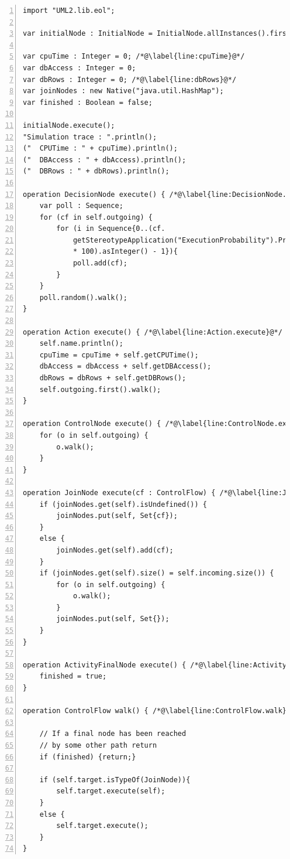 \begin{lstlisting}[float=tbp, basicstyle=\ttfamily\footnotesize, flexiblecolumns=true, numbers=left, nolol=true, caption=Simulation using EOL, label=lst:SAP.EOL, language=EOL, tabsize=2]
import "UML2.lib.eol";

var initialNode : InitialNode = InitialNode.allInstances().first();

var cpuTime : Integer = 0; /*@\label{line:cpuTime}@*/
var dbAccess : Integer = 0;
var dbRows : Integer = 0; /*@\label{line:dbRows}@*/
var joinNodes : new Native("java.util.HashMap");
var finished : Boolean = false;

initialNode.execute();
"Simulation trace : ".println();
("	CPUTime : " + cpuTime).println();
("	DBAccess : " + dbAccess).println();
("	DBRows : " + dbRows).println();

operation DecisionNode execute() { /*@\label{line:DecisionNode.execute}@*/
	var poll : Sequence;
	for (cf in self.outgoing) {
		for (i in Sequence{0..(cf.
			getStereotypeApplication("ExecutionProbability").Probability 
			* 100).asInteger() - 1}){
			poll.add(cf);
		}
	}
	poll.random().walk();
}

operation Action execute() { /*@\label{line:Action.execute}@*/
	self.name.println();
	cpuTime = cpuTime + self.getCPUTime();
	dbAccess = dbAccess + self.getDBAccess();
	dbRows = dbRows + self.getDBRows();
	self.outgoing.first().walk();
}

operation ControlNode execute() { /*@\label{line:ControlNode.execute}@*/
	for (o in self.outgoing) {
		o.walk();
	}
}

operation JoinNode execute(cf : ControlFlow) { /*@\label{line:JoinNode.execute}@*/
	if (joinNodes.get(self).isUndefined()) {
		joinNodes.put(self, Set{cf});
	}
	else {
		joinNodes.get(self).add(cf);
	}
	if (joinNodes.get(self).size() = self.incoming.size()) {
		for (o in self.outgoing) {
			o.walk();
		}
		joinNodes.put(self, Set{});
	}
}

operation ActivityFinalNode execute() { /*@\label{line:ActivityFinalNode.execute}@*/
	finished = true;
}

operation ControlFlow walk() { /*@\label{line:ControlFlow.walk}@*/
	
	// If a final node has been reached
	// by some other path return
	if (finished) {return;}

	if (self.target.isTypeOf(JoinNode)){
		self.target.execute(self);
	}
	else {
		self.target.execute();
	}
}
\end{lstlisting}

